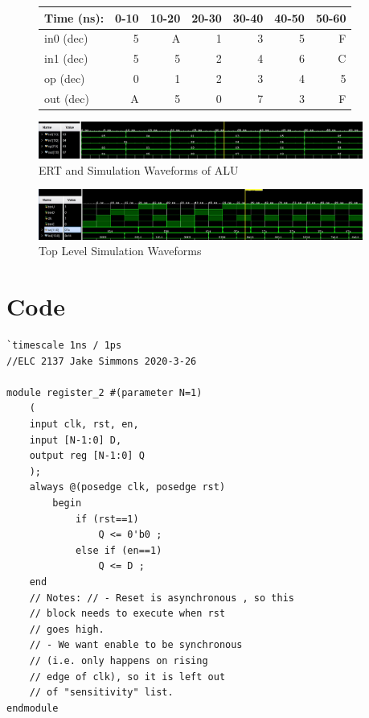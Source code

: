\documentclass[11pt]{article}
\begin{document}
\begin{figure}[ht]\centering
	\begin{tabular}{l|rrrrrr}
		Time (ns): & 0-10 & 10-20 & 20-30 & 30-40 & 40-50 & 50-60  \\
		\midrule
		in0 (dec) & 5 & A & 1 & 3 & 5 & F \\
		in1 (dec) & 5 & 5 & 2 & 4 & 6 & C \\
		op (dec) & 0 & 1 & 2 & 3 & 4 & 5 \\
		\midrule 
		out (dec) & A & 5 & 0 & 7 & 3 & F \\
		\bottomrule
	\end{tabular}\medskip
	
		\includegraphics[width=0.95\textwidth]{ALU_test.JPG}
		\caption{ERT and Simulation Waveforms of ALU}
		\label{fig:sim_with_table}
\end{figure}

\begin{figure}[ht]\centering
	\includegraphics[width=0.95\textwidth]{top_module_test.JPG}
	\caption{Top Level Simulation Waveforms}
	\label{fig:sim}
	
\end{figure}


\clearpage
\section*{Code}

\begin{lstlisting}[style=Verilog,
caption=Register Module,
label=register 
]
`timescale 1ns / 1ps
//ELC 2137 Jake Simmons 2020-3-26

module register_2 #(parameter N=1) 
	(
	input clk, rst, en, 
	input [N-1:0] D, 
	output reg [N-1:0] Q 
	);
	always @(posedge clk, posedge rst) 
		begin       
			if (rst==1) 
				Q <= 0'b0 ; 
			else if (en==1) 
				Q <= D ; 
	end
	// Notes: // - Reset is asynchronous , so this 
	// block needs to execute when rst 
	// goes high.
	// - We want enable to be synchronous 
	// (i.e. only happens on rising 
	// edge of clk), so it is left out 
	// of "sensitivity" list.
endmodule

\end{lstlisting}
\end{document}
